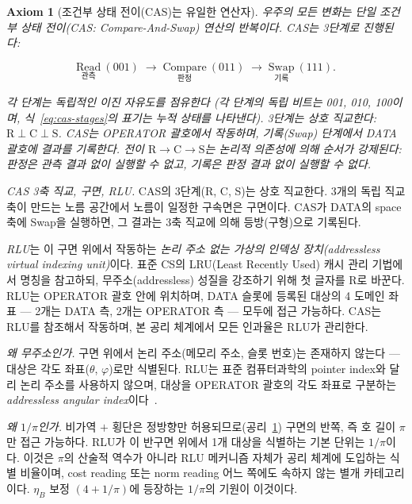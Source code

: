 \documentclass[entropy,article,submit,pdftex,oneauthor]{Definitions/mdpi}
\newtheorem{Axiom}{Axiom}
\begin{document}
\begin{Axiom}[조건부 상태 전이(CAS)는 유일한 연산자]\label{ax:cas}
우주의 모든 변화는 단일 조건부 상태 전이(CAS: Compare-And-Swap) 연산의 반복이다. CAS는 3단계로 진행된다:
\begin{linenomath}
\begin{equation}
\underset{\text{관측}}{\mathrm{Read}}\ (001) \;\longrightarrow\; \underset{\text{판정}}{\mathrm{Compare}}\ (011) \;\longrightarrow\; \underset{\text{기록}}{\mathrm{Swap}}\ (111).
\label{eq:cas-stages}
\end{equation}
\end{linenomath}
각 단계는 독립적인 이진 자유도를 점유한다 (각 단계의 독립 비트는 001, 010, 100이며, 식~\eqref{eq:cas-stages}의 표기는 누적 상태를 나타낸다). 3단계는 상호 직교한다: $\mathrm{R} \perp \mathrm{C} \perp \mathrm{S}$. CAS는 OPERATOR 괄호에서 작동하며, 기록(Swap) 단계에서 DATA 괄호에 결과를 기록한다. 전이 $\mathrm{R} \to \mathrm{C} \to \mathrm{S}$는 논리적 의존성에 의해 순서가 강제된다: 판정은 관측 결과 없이 실행할 수 없고, 기록은 판정 결과 없이 실행할 수 없다.
\end{Axiom}

\emph{CAS 3축 직교, 구면, RLU.} CAS의 3단계(R, C, S)는 상호 직교한다. 3개의 독립 직교 축이 만드는 노름 공간에서 노름이 일정한 구속면은 구면이다. CAS가 DATA의 space 축에 Swap을 실행하면, 그 결과는 3축 직교에 의해 등방(구형)으로 기록된다.

\emph{RLU}는 이 구면 위에서 작동하는 \emph{논리 주소 없는 가상의 인덱싱 장치(addressless virtual indexing unit)}이다. 표준 CS의 LRU(Least Recently Used) 캐시 관리 기법에서 명칭을 참고하되, 무주소(addressless) 성질을 강조하기 위해 첫 글자를 R로 바꾼다. RLU는 OPERATOR 괄호 안에 위치하며, DATA 슬롯에 등록된 대상의 4 도메인 좌표 --- 2개는 DATA 측, 2개는 OPERATOR 측 --- 모두에 접근 가능하다. CAS는 RLU를 참조해서 작동하며, 본 공리 체계에서 모든 인과율은 RLU가 관리한다.

\emph{왜 무주소인가.} 구면 위에서 논리 주소(메모리 주소, 슬롯 번호)는 존재하지 않는다 --- 대상은 각도 좌표($\theta$, $\varphi$)로만 식별된다. RLU는 표준 컴퓨터과학의 pointer index와 달리 논리 주소를 사용하지 않으며, 대상을 OPERATOR 괄호의 각도 좌표로 구분하는 \emph{addressless angular index}이다~\cite{han2026}.

\emph{왜 $1/\pi$인가.} 비가역 $+$ 횡단은 정방향만 허용되므로(공리~\ref{ax:cas}) 구면의 반쪽, 즉 호 길이 $\pi$만 접근 가능하다. RLU가 이 반구면 위에서 1개 대상을 식별하는 기본 단위는 $1/\pi$이다. 이것은 $\pi$의 산술적 역수가 아니라 RLU 메커니즘 자체가 공리 체계에 도입하는 식별 비율이며, cost reading 또는 norm reading 어느 쪽에도 속하지 않는 별개 카테고리이다. $\eta_B$ 보정 $(4 + 1/\pi)$에 등장하는 $1/\pi$의 기원이 이것이다.
\end{document}
